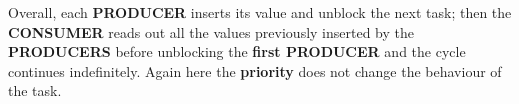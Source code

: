 Overall, each \textbf{PRODUCER} inserts its value and unblock the next task; then the \textbf{CONSUMER} reads out all the values previously inserted by the \textbf{PRODUCERS} before unblocking the \textbf{first PRODUCER} and the cycle continues indefinitely.
Again here the \textbf{priority} does not change the behaviour of the task.